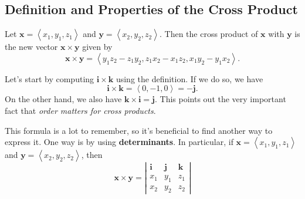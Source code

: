 \documentclass[10pt,]{book}
\newcommand{\terminology}[1]{\textbf{#1}}
\theoremstyle{ptxplainnotitle}
\theoremstyle{ptxplaintitle}
\theoremstyle{ptxplainnotitle}
\theoremstyle{ptxplaintitle}
\theoremstyle{ptxplainnotitle}
\theoremstyle{ptxplaintitle}
\theoremstyle{ptxdefinitionnotitle}
\theoremstyle{ptxdefinitiontitle}
\theoremstyle{ptxdefinitionnotitle}
\theoremstyle{ptxdefinitiontitle}
\theoremstyle{ptxdefinitionnotitle}
\theoremstyle{ptxdefinitiontitle}
\theoremstyle{ptxdefinitionnotitle}
\theoremstyle{ptxdefinitiontitle}
\theoremstyle{ptxdefinitionnotitle}
\theoremstyle{ptxdefinitiontitle}
\numberwithin{equation}{section}
\newcommand{\vv}[1]{\mathbf{#1}}
\newcommand{\dotprod}[1]{\left\langle #1 \right\rangle}
\begin{document}
\subsection[{Definition and Properties of the Cross Product}]{Definition and Properties of the Cross Product}\label{subsection-definition-and-properties-of-the-cross-product}
\begin{definition}\label{definition-the-cross-product}
\hypertarget{p-823}{}%
Let \(\vv{x} = \dotprod{x_{1},y_{1},z_{1}}\) and \(\vv{y} = \dotprod{x_{2},y_{2},z_{2}}\). Then the cross product of \(\vv{x}\) with \(\vv{y}\) is the new vector \(\vv{x}\times\vv{y}\) given by%
%
\begin{equation*}
\vv{x}\times\vv{y} = \dotprod{y_{1}z_{2}-z_{1}y_{2}, z_{1}x_{2}-x_{1}z_{2}, x_{1}y_{2} - y_{1}x_{2}}.
\end{equation*}
\end{definition}
\begin{example}\label{example-cross-product-of-basis-vectors}
\hypertarget{p-824}{}%
Let's start by computing \(\vv{i}\times\vv{k}\) using the definition. If we do so, we have%
%
\begin{equation*}
\vv{i}\times\vv{k} = \dotprod{0,-1,0} = -\vv{j}.
\end{equation*}
\hypertarget{p-825}{}%
On the other hand, we also have \(\vv{k}\times\vv{i} = \vv{j}\). This points out the very important fact that \emph{order matters for cross products}.%
\end{example}
\hypertarget{p-826}{}%
This formula is a lot to remember, so it's beneficial to find another way to express it. One way is by using \terminology{determinants}. In particular, if \(\vv{x} = \dotprod{x_{1},y_{1},z_{1}}\) and \(\vv{y} = \dotprod{x_{2},y_{2},z_{2}}\), then%
%
\begin{equation}
\vv{x}\times\vv{y} = \left|\begin{array}{ccc}
\vv{i} & \vv{j} & \vv{k} \\ x_{1} & y_{1} & z_{1} \\ x_{2} & y_{2} & z_{2} \end{array}\right|\label{equation-cross-product-determinant}
\end{equation}
\end{document}
